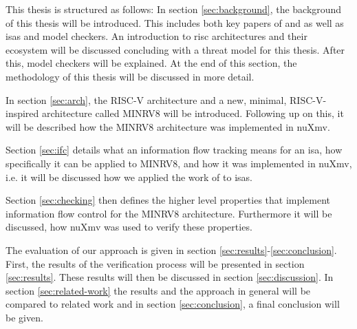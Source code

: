 This thesis is structured as follows:
In section \ref{sec:background}, the background of this thesis will be introduced.
This includes both key papers of \citeauthor{Reid17} and \citeauthor{Ferraiuolo17} as well as \glspl{isa} and model checkers.
An introduction to \gls{risc} architectures and their ecosystem will be discussed concluding with a threat model for this thesis.
After this, model checkers will be explained.
At the end of this section, the methodology of this thesis will be discussed in more detail.

In section \ref{sec:arch}, the RISC-V architecture and a new, minimal, RISC-V-inspired architecture called MINRV8 will be introduced.
Following up on this, it will be described how the MINRV8 architecture was implemented in nuXmv.

Section \ref{sec:ifc} details what an information flow tracking means for an \gls{isa}, how specifically it can be applied to MINRV8, and how it was implemented in nuXmv, i.e. it will be discussed how we applied the work of \citeauthor{Ferraiuolo17} \cite{Ferraiuolo17} to \glspl{isa}.

Section \ref{sec:checking} then defines the higher level properties that implement information flow control for the MINRV8 architecture.
Furthermore it will be discussed, how nuXmv was used to verify these properties.

The evaluation of our approach is given in section \ref{sec:results}-\ref{sec:conclusion}.
First, the results of the verification process will be presented in section \ref{sec:results}.
These results will then be discussed in section \ref{sec:discussion}.
In section \ref{sec:related-work} the results and the approach in general will be compared to related work and in section \ref{sec:conclusion}, a final conclusion will be given.

